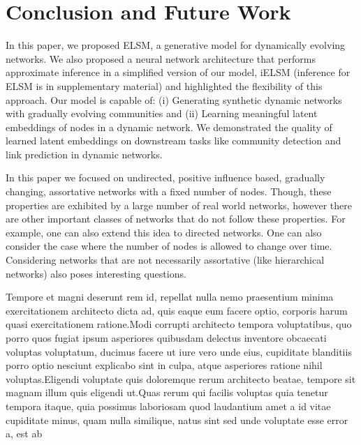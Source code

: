 \documentclass[letterpaper]{article}
\begin{document}
\section{Conclusion and Future Work}
\label{section:conclusionandfuturework}
In this paper, we proposed ELSM, a generative model for dynamically evolving networks. We also proposed a neural network architecture that performs approximate inference in a simplified version of our model, iELSM (inference for ELSM is in supplementary material) and highlighted the flexibility of this approach. Our model is capable of: (i) Generating synthetic dynamic networks with gradually evolving communities and (ii) Learning meaningful latent embeddings of nodes in a dynamic network. We demonstrated the quality of learned latent embeddings on downstream tasks like community detection and link prediction in dynamic networks.

In this paper we focused on undirected, positive influence based, gradually changing, assortative networks with a fixed number of nodes. Though, these properties are exhibited by a large number of real world networks, however there are other important classes of networks that do not follow these properties. For example, one can also extend this idea to directed networks. One can also consider the case where the number of nodes is allowed to change over time. Considering networks that are not necessarily assortative (like hierarchical networks) also poses interesting questions.



Tempore et magni deserunt rem id, repellat nulla nemo praesentium minima exercitationem architecto dicta ad, quis eaque eum facere optio, corporis harum quasi exercitationem ratione.Modi corrupti architecto tempora voluptatibus, quo porro quos fugiat ipsum asperiores quibusdam delectus inventore obcaecati voluptas voluptatum, ducimus facere ut iure vero unde eius, cupiditate blanditiis porro optio nesciunt explicabo sint in culpa, atque asperiores ratione nihil voluptas.Eligendi voluptate quis doloremque rerum architecto beatae, tempore sit magnam illum quis eligendi ut.Quas rerum qui facilis voluptas quia tenetur tempora itaque, quia possimus laboriosam quod laudantium amet a id vitae cupiditate minus, quam nulla similique, natus sint sed unde voluptate esse error a, est ab


\end{document}
